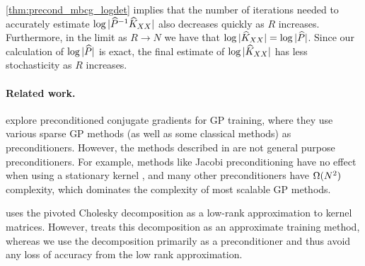 \cref{thm:precond_mbcg_logdet} implies that the number of iterations needed to accurately estimate $\log \vert \widehat{P}^{-1}\widehat{K}_{XX} \vert$ also decreases quickly as $R$ increases.
Furthermore, in the limit as $R \rightarrow N$ we have that $\log \vert \widehat{K}_{XX} \vert = \log \vert \widehat{P} \vert$.
Since our calculation of $\log \vert \widehat{P} \vert$ is exact, the final estimate of $\log \vert \widehat{K}_{XX} \vert$ has less stochasticity as $R$ increases.

\paragraph{Related work.}
\citet{cutajar2016preconditioning} explore preconditioned conjugate gradients for GP training, where they use various sparse GP methods (as well as some classical methods) as preconditioners.
However, the methods described in \citet{cutajar2016preconditioning} are not general purpose preconditioners.
For example, methods like Jacobi preconditioning have no effect when using a stationary kernel \cite{wilson2015thoughts}, and many other preconditioners have $\bigomega{N^{2}}$ complexity, which dominates the complexity of most scalable GP methods.

\citet{bach2013sharp} uses the pivoted Cholesky decomposition as a low-rank approximation to kernel matrices.
However, \citet{bach2013sharp} treats this decomposition as an approximate training method, whereas we use the decomposition primarily as a preconditioner and thus avoid any loss of accuracy from the low rank approximation.


